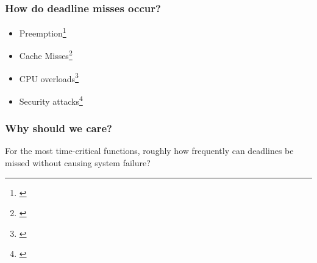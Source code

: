 \begin{frame}
    \frametitle{How do deadline misses occur?}
    \begin{itemize}\setlength\itemsep{1em}
        \item Preemption\footnote{\cite{Stankovic:1995, Bernat:2001}}
        \item Cache Misses\footnote{\cite{Milligan:1996, Wang:2012, Altmeyer:2014, Davis:2013}}
        \item CPU overloads\footnote{\cite{Baruah:1997, Xu:2015, Ernst:2014}}
        \item Security attacks\footnote{\cite{hashemi2018comparison, sabaliauskaite2017comparison, Knorn:2019}}
    \end{itemize}
\end{frame}

\begin{frame}
    \frametitle{Why should we care?}
    For the most time-critical functions, roughly how frequently can deadlines be missed without causing system failure?~\parencite{Akesson:2020}
    \begin{figure}[h]
        \centering
        
    \end{figure}
\end{frame}
